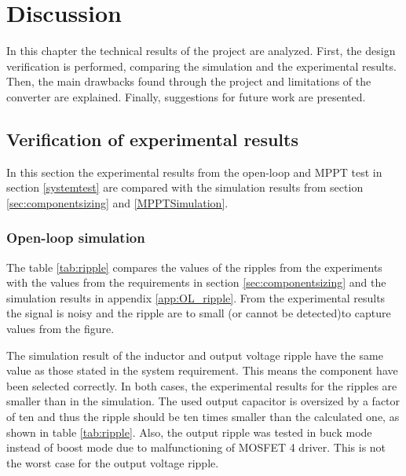\chapter{Discussion}

In this chapter the technical results of the project are analyzed. First, the design verification is performed, comparing the simulation and the experimental results. Then, the main drawbacks found through the project and limitations of the converter are explained. Finally, suggestions for future work are presented.

\section{Verification of experimental results} \label{Experiment_verification}
In this section the experimental results from the open-loop and MPPT test in section \ref{systemtest} are compared with the simulation results from section \ref{sec:componentsizing} and \ref{MPPTSimulation}.

\subsection{Open-loop simulation} \label{ol_discussion}


The table \ref{tab:ripple} compares the values of the ripples from the experiments with the values from the requirements in section \ref{sec:componentsizing} and the simulation results in appendix \ref{app:OL_ripple}. 
From the experimental results the signal is noisy and the ripple are to small (or cannot be detected)to capture values from the figure. 

The simulation result of the inductor and output voltage ripple have the same value as those stated in the system requirement. This means the component have been selected correctly. 
In both cases, the experimental results for the ripples are smaller than in the simulation. The used output capacitor is oversized by a factor of ten and thus the ripple should be ten times smaller than the calculated one, as shown in table \ref{tab:ripple}. Also, the output ripple was tested in buck mode instead of boost mode due to malfunctioning of MOSFET 4 driver. This is not the worst case for the output voltage ripple.

